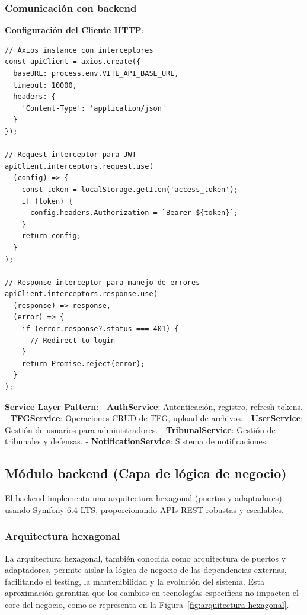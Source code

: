 \documentclass[12pt,a4paper,oneside]{report}
\begin{document}
\subsubsection{Comunicación con
backend}\label{comunicaciuxf3n-con-backend}

\textbf{Configuración del Cliente HTTP}:

\begin{lstlisting}
// Axios instance con interceptores
const apiClient = axios.create({
  baseURL: process.env.VITE_API_BASE_URL,
  timeout: 10000,
  headers: {
    'Content-Type': 'application/json'
  }
});

// Request interceptor para JWT
apiClient.interceptors.request.use(
  (config) => {
    const token = localStorage.getItem('access_token');
    if (token) {
      config.headers.Authorization = `Bearer ${token}`;
    }
    return config;
  }
);

// Response interceptor para manejo de errores
apiClient.interceptors.response.use(
  (response) => response,
  (error) => {
    if (error.response?.status === 401) {
      // Redirect to login
    }
    return Promise.reject(error);
  }
);
\end{lstlisting}

\textbf{Service Layer Pattern}: - \textbf{AuthService}: Autenticación,
registro, refresh tokens. - \textbf{TFGService}: Operaciones CRUD de
TFG, upload de archivos. - \textbf{UserService}: Gestión de usuarios
para administradores. - \textbf{TribunalService}: Gestión de tribunales
y defensas. - \textbf{NotificationService}: Sistema de notificaciones.

\subsection{Módulo backend (Capa de lógica de
negocio)}\label{muxf3dulo-backend-capa-de-luxf3gica-de-negocio}

El backend implementa una arquitectura hexagonal (puertos y adaptadores)
usando Symfony 6.4 LTS, proporcionando APIs REST robustas y escalables.

\subsubsection{Arquitectura hexagonal}\label{arquitectura-hexagonal}

La arquitectura hexagonal, también conocida como arquitectura de puertos y adaptadores, permite aislar la lógica de negocio de las dependencias externas, facilitando el testing, la mantenibilidad y la evolución del sistema. Esta aproximación garantiza que los cambios en tecnologías específicas no impacten el core del negocio, como se representa en la Figura~\ref{fig:arquitectura-hexagonal}.
\end{document}
